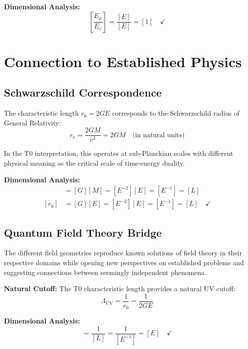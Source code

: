 \documentclass[12pt,a4paper]{report}
\newcommand{\rzero}{r_0}                  %
\begin{document}
	\textbf{Dimensional Analysis:}
	\begin{equation}
		\left[\frac{E_{\mu}}{E_e}\right] = \frac{[E]}{[E]} = [1] \quad \checkmark
	\end{equation}
	
	\section{Connection to Established Physics}\label{sec:connection_established}
	
	\subsection{Schwarzschild Correspondence}\label{subsec:schwarzschild_correspondence}
	
	The characteristic length $\rzero = 2GE$ corresponds to the Schwarzschild radius of General Relativity:
	\begin{equation}
		r_s = \frac{2GM}{c^2} = 2GM \quad \text{(in natural units)}
	\end{equation}
	
	In the T0 interpretation, this operates at sub-Planckian scales with different physical meaning as the critical scale of time-energy duality.
	
	\textbf{Dimensional Analysis:}
	\begin{align}
		[r_s] &= [G][M] = [E^{-2}][E] = [E^{-1}] = [L] \\
		[\rzero] &= [G][E] = [E^{-2}][E] = [E^{-1}] = [L] \quad \checkmark
	\end{align}
	
	\subsection{Quantum Field Theory Bridge}\label{subsec:qft_bridge}
	
	The different field geometries reproduce known solutions of field theory in their respective domains while opening new perspectives on established problems and suggesting connections between seemingly independent phenomena.
	
	\textbf{Natural Cutoff:}
	The T0 characteristic length provides a natural UV cutoff:
	\begin{equation}
		\Lambda_{\text{UV}} = \frac{1}{\rzero} = \frac{1}{2GE}
	\end{equation}
	
	\textbf{Dimensional Analysis:}
	\begin{equation}
		[\Lambda_{\text{UV}}] = \frac{1}{[L]} = \frac{1}{[E^{-1}]} = [E] \quad \checkmark
	\end{equation}
	
\end{document}
